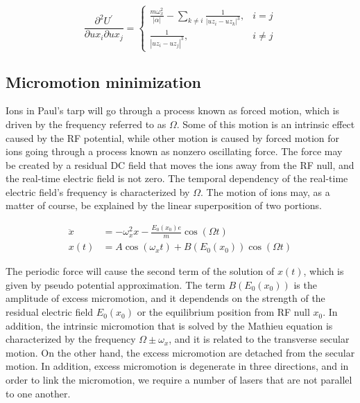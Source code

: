 \begin{equation}
    \frac{\partial^2 U^{\prime}}{\partial u x_i \partial u x_j}= \begin{cases}\frac{m \omega_x^2}{|\alpha|}-\sum_{k \neq i} \frac{1}{\left|u z_i-u z_k\right|^3}, & i=j \\ \frac{1}{\left|u z_i-u z_j\right|^3}, & i \neq j\end{cases}
\end{equation}

\subsection{Micromotion minimization}

Ions in Paul's tarp will go through a process known as forced motion, which is driven by the frequency referred to as \(\Omega\). Some of this motion is an intrinsic effect caused by the RF potential, while other motion is caused by forced motion for ions going through a process known as nonzero oscillating force. The force may be created by a residual DC field that moves the ions away from the RF null, and the real-time electric field is not zero. The temporal dependency of the real-time electric field's frequency is characterized by \(\Omega\). The motion of ions may, as a matter of course, be explained by the linear superposition of two portions.

\begin{equation}\label{eq:excess_micromotion}
    \begin{aligned}
        \ddot{x} & =-\omega_x^2 x-\frac{E_0\left(x_0\right) e}{m} \cos (\Omega t)                    \\
        x(t)     & =A \cos \left(\omega_x t\right)+B\left(E_0\left(x_0\right)\right) \cos (\Omega t)
    \end{aligned}
\end{equation}

The periodic force will cause the second term of the solution of \(x(t)\), which is given by pseudo potential approximation. The term \(B(E_0(x_0))\) is the amplitude of excess micromotion, and it dependends on the strength of the residual electric field \(E_0(x_0)\) or the equilibrium position from RF null \(x_0\). In addition, the intrinsic micromotion that is solved by the Mathieu equation is characterized by the frequency \(\Omega\pm \omega_x\), and it is related to the transverse secular motion. On the other hand, the excess micromotion are detached from the secular motion. In addition, excess micromotion is degenerate in three directions, and in order to link the micromotion, we require a number of lasers that are not parallel to one another.


